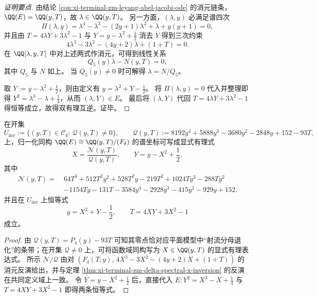 \begin{proof}[证明要点]
由结论 \ref{con:xi-terminal-zm-leyang-abel-jacobi-ode} 的消元链条，\(\QQ(E)=\QQ(y,T)\)，故 \(\lambda\in\QQ(y,T)\)。
另一方面，\((\lambda,y)\) 必满足谱四次
\[
\Pi(\lambda,y)=\lambda^{4}-\lambda^{3}-(2y+1)\lambda^{2}+\lambda+y(y+1)=0,
\]
并且由 \(T=4\lambda Y+3\lambda^{2}-1\) 与 \(Y=y-\lambda^{2}+\frac12\) 消去 \(Y\) 得到三次约束
\[
4\lambda^{3}-3\lambda^{2}-(4y+2)\lambda+(1+T)=0.
\]
在 \(\QQ[\lambda,y,T]\) 中对上述两式作消元，可得到线性关系
\[
Q_{5}(y)\lambda-N(y,T)=0,
\]
其中 \(Q_5\) 与 \(N\) 如上。
当 \(Q_5(y)\neq 0\) 时可解得 \(\lambda=N/Q_5\)。

取 \(Y:=y-\lambda^2+\tfrac12\)，则由定义有 \(y=\lambda^2+Y-\tfrac12\)。
将 \(\Pi(\lambda,y)=0\) 代入并整理即得
\(
Y^2=\lambda^3-\lambda+\tfrac14
\)，从而 \((\lambda,Y)\in E\)。
最后将 \((\lambda,Y)\) 代回 \(T=4\lambda Y+3\lambda^2-1\) 得恒等成立，故得双有理互逆。证毕。
\end{proof}

\begin{proposition}[平面射流坐标的显式反演]\label{prop:xi-terminal-zm-delta-jet-plane-explicit-inversion}
在开集
\[
U_{\mathrm{inv}}:=\{(y,T)\in\mathcal C_\delta:\ \mathcal Q(y,T)\neq 0\},
\qquad
\mathcal Q(y,T):=8192y^{4}+5888y^{3}-3680y^{2}-2848y+152-93T,
\]
上，归一化同构 \(\QQ(E)\cong \QQ(y,T)/(F_\delta)\) 的谱坐标可写成显式有理式
\[
X=\frac{\mathcal N(y,T)}{\mathcal Q(y,T)},
\qquad
Y=y-X^{2}+\frac12,
\]
其中
\[
\begin{aligned}
\mathcal N(y,T)=\;&64T^{3}+512T^{2}y^{2}+528T^{2}y-219T^{2}+1024Ty^{3}-288Ty^{2}\\
&-1154Ty-131T-3584y^{4}-2928y^{3}-415y^{2}-929y+152.
\end{aligned}
\]
并且在 \(U_{\mathrm{inv}}\) 上恒等式
\[
y=X^{2}+Y-\frac12,
\qquad
T=4XY+3X^{2}-1
\]
成立。
\end{proposition}
\begin{proof}
由 \(\mathcal Q(y,T)=P_4(y)-93T\) 可知其零点恰对应平面模型中“射流分母退化”的条带；在开集 \(\mathcal Q\neq 0\) 上，可将函数域同构写为 \(X\in\QQ(y,T)\) 的显式有理表达式。
所示 \(\mathcal N/\mathcal Q\) 由对 \((F_\delta(T;y),\,4X^{3}-3X^{2}-(4y+2)X+(1+T))\) 的消元反演给出，并与定理 \ref{thm:xi-terminal-zm-delta-spectral-x-inversion} 的反演在共同定义域上一致。
令 \(Y=y-X^{2}+\tfrac12\) 后，直接代入 \(E:Y^2=X^3-X+\tfrac14\) 与 \(T=4XY+3X^2-1\) 即得两条恒等式。
\end{proof}

